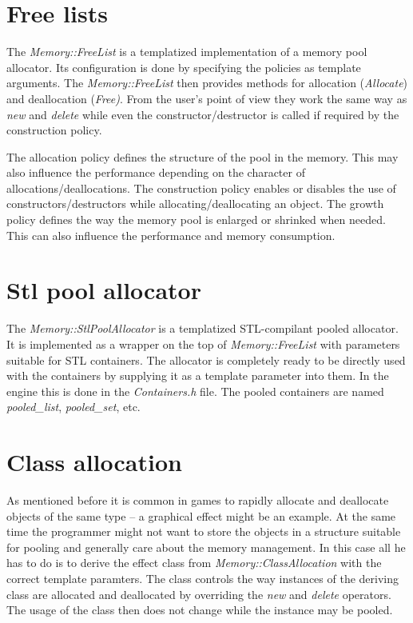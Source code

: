 \section{Free lists}
The \emph{Memory::FreeList} is a templatized implementation of a memory pool allocator. Its configuration is done by specifying the policies as template arguments. The \emph{Memory::FreeList} then provides methods for allocation (\emph{Allocate}) and deallocation (\emph{Free)}. From the user's point of view they work the same way as \emph{new} and \emph{delete} while even the constructor/destructor is called if required by the construction policy.

The allocation policy defines the structure of the pool in the memory. This may also influence the performance depending on the character of allocations/deallocations. The construction policy enables or disables the use of constructors/destructors while allocating/deallocating an object. The growth policy defines the way the memory pool is enlarged or shrinked when needed. This can also influence the performance and memory consumption.

\section{Stl pool allocator}
The \emph{Memory::StlPoolAllocator} is a templatized STL-compilant pooled allocator. It is implemented as a wrapper on the top of \emph{Memory::FreeList} with parameters suitable for STL containers. The allocator is completely ready to be directly used with the containers by supplying it as a template parameter into them. In the engine this is done in the \emph{Containers.h} file. The pooled containers are named \emph{pooled\_list}, \emph{pooled\_set}, etc.

\section{Class allocation}
As mentioned before it is common in games to rapidly allocate and deallocate objects of the same type -- a graphical effect might be an example. At the same time the programmer might not want to store the objects in a structure suitable for pooling and generally care about the memory management. In this case all he has to do is to derive the effect class from \emph{Memory::ClassAllocation} with the correct template paramters. The class controls the way instances of the deriving class are allocated and deallocated by overriding the \emph{new} and \emph{delete} operators. The usage of the class then does not change while the instance may be pooled.



